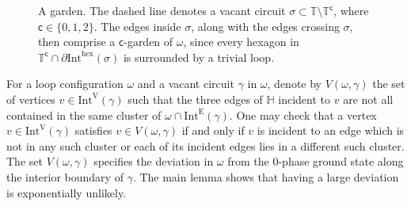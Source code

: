 \documentclass[12pt,reqno]{article}
\def\T{\mathbb{T}}
\newcommand{\HH}{\mathbb{H}}
\newcommand{\IntEdge}[1]{\mathrm{Int}^\mathrm{E}(#1)}
\newcommand{\IntVert}[1]{\mathrm{Int}^\mathrm{V}(#1)}
\newcommand{\IntHex}[1]{\mathrm{Int}^{\mathrm{hex}}(#1)}
\newcommand{\clr}{{{\mathsf{c}}}}
\begin{document}
\begin{figure}
   \centering


   \caption{A garden. The dashed line denotes a vacant circuit $\sigma \subset \T \setminus \T^\clr$, where $\clr\in\{0,1,2\}$. The edges inside $\sigma$, along with the edges crossing $\sigma$, then comprise a $\clr$-garden of $\omega$, since every hexagon in $\T^\clr \cap \partial \IntHex\sigma$ is surrounded by a trivial loop.}
   \label{fig:garden}
\end{figure}





\medbreak
{}
\label{sec:main lemma}
For a loop configuration $\omega$ and a vacant circuit $\gamma$ in
$\omega$, denote by $V(\omega,\gamma)$ the set of vertices $v \in
\IntVert\gamma$ such that the three edges of $\HH$ incident to $v$
are not all contained in the same cluster of $\omega \cap \IntEdge\gamma$. One may check that a vertex $v\in\IntVert\gamma$ satisfies $v\in V(\omega, \gamma)$ if and only if $v$ is incident to an edge which is not in any such cluster or each of its incident edges lies in a different such cluster.
The set $V(\omega, \gamma)$ specifies the deviation in $\omega$ from the $0$-phase ground state along the interior boundary of $\gamma$. The main lemma shows that having a large deviation is exponentially unlikely.
\end{document}
